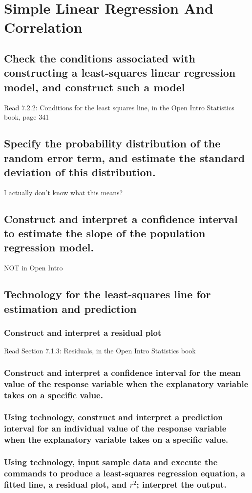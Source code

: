 \setcounter{chapter}{12}
\chapter{Simple Linear Regression And Correlation}

\section{Check the conditions associated with constructing  a least-squares linear regression model, and construct such a model}

Read 7.2.2: Conditions for the least squares line, in the Open Intro Statistics book, page 341

\section{Specify the probability distribution of the random error term, and estimate the standard deviation of this distribution.}

I actually don't know what this means?

\section{Construct and interpret a confidence interval to estimate the slope of the population regression model.}

NOT in Open Intro

\section{Technology for the least-squares line for estimation and prediction}

     \subsection{Construct and interpret a residual plot} 

Read Section 7.1.3: Residuals, in the Open Intro Statistics book
 \subsection{Construct and interpret a confidence interval for the mean value of the response variable when the explanatory variable takes on a specific value.}
     \subsection{Using technology, construct and interpret a prediction interval for an individual value of the response variable when the explanatory variable takes on a specific value.}
     \subsection{Using technology, input sample data and execute the commands to produce a least-squares regression equation, a fitted line, a residual plot, and \(r^2\); interpret the output.}